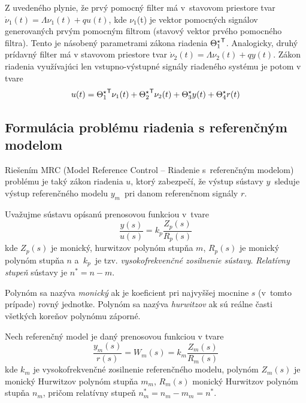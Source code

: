 \documentclass[a4paper, 10pt, ]{article}
\begin{document}
Z uvedeného plynie, že prvý pomocný filter má v~stavovom priestore tvar $ \dot \nu_1(t) = \Lambda \nu_1(t) + q u(t) $, kde $\nu_1$(t) je vektor pomocných signálov generovaných prvým pomocným filtrom (stavový vektor prvého pomocného filtra). Tento je násobený parametrami zákona riadenia ${\Theta_1^\star}^{\mathsf{T}}$. Analogicky, druhý prídavný filter má v stavovom priestore tvar $ \dot{\nu}_2(t) = \Lambda \nu_2(t) + q y(t) $. Zákon riadenia využívajúci len vstupno-výstupné signály riadeného systému je potom v tvare
\begin{align} \label{zakriadspoz}
	u(t) = {\Theta_1^\star}^{\mathsf{T}} \nu_1(t) + {\Theta_2^\star}^{\mathsf{T}} \nu_2(t) + \Theta_3^\star y(t) + \Theta_4^\star r(t)
\end{align}


















\subsection{Formulácia problému riadenia s referenčným modelom}
\label{MRC problém}



Riešením MRC (Model Reference Control -- Riadenie s~referenčným modelom) problému je taký zákon riadenia $u$, ktorý zabezpečí, že výstup sústavy $y$~sleduje výstup referenčného modelu $y_m$~pri danom referenčnom signály $r$.



Uvažujme sústavu opísanú prenosovou funkciou v~tvare
\begin{equation} \label{PFsustavy_MRCp}
	\frac{y(s)}{u(s)} = k_p \frac{Z_p(s)}{R_p(s)}
\end{equation}
kde $Z_p(s)$ je monický, hurwitzov polynóm stupňa $m$, $R_p(s)$ je monický polynóm stupňa $n$ a~$k_p$~je tzv. \emph{vysokofrekvenčné zosilnenie sústavy}. \emph{Relatívny stupeň} sústavy je $n^* = n - m$.

Polynóm sa nazýva \emph{monický} ak je koeficient pri najvyššej mocnine $s$ (v~tomto prípade) rovný jednotke. Polynóm sa nazýva \emph{hurwitzov} ak sú reálne časti všetkých koreňov polynómu záporné.

Nech referenčný model je daný prenosovou funkciou v tvare
\begin{equation} \label{RefModelMRCp}
	\frac{y_m(s)}{r(s)} = W_m(s) = k_m \frac{Z_m(s)}{R_m(s)}
\end{equation}
kde $k_m$ je vysokofrekvenčné zosilnenie referenčného modelu, polynóm $Z_m(s)$ je monický Hurwitzov polynóm stupňa $m_m$, $R_m(s)$ monický Hurwitzov polynóm stupňa $n_m$, pričom relatívny stupeň $n^*_m = n_m - m_m = n^*$.
\end{document}
